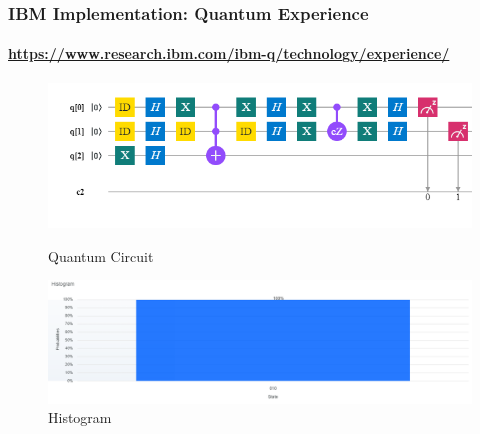\begin{frame}
	\frametitle{IBM Implementation: Quantum Experience}
	\framesubtitle{\href{https://www.research.ibm.com/ibm-q/technology/experience/}{https://www.research.ibm.com/ibm-q/technology/experience/}}
	\begin{figure}[ht]
		\begin{minipage}[b]{0.65\linewidth}
			\centering
			\includegraphics[trim=0 0 0 0,width=\textwidth]{figures/ibm-implementation/circuit.png}
			\caption{Quantum Circuit}
			\label{fig:a}
		\end{minipage}
		\hspace{0.5cm}
		\begin{minipage}[b]{0.3\linewidth}
			\centering
			\includegraphics[width=\textwidth]{figures/ibm-implementation/histogram.png}
			\caption{Histogram}
			\label{fig:b}
		\end{minipage}
	\end{figure}
\end{frame}

